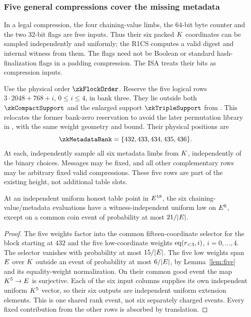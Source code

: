 \subsubsection{Five general compressions cover the missing metadata}

In a legal compression, the four chaining-value limbs, the $64$-bit byte counter and the two $32$-bit flags are free inputs. Thus their six packed $K$ coordinates can be sampled independently and uniformly; the R1CS computes a valid digest and internal witness from them. The flags need not be Boolean or standard hash-finalization flags in a padding compression. The ISA treats their bits as compression inputs.

Use the physical order $\zkFlockOrder$. Reserve the five logical rows $3\cdot2048+768+i$, $0\le i\le4$, in bank three. They lie outside both $\zkCompactSupport$ and the enlarged support $\zkTripleSupport$ from . This relocates the former bank-zero reservation to avoid the later permutation library in , with the same weight geometry and bound. Their physical positions are
\[
 \zkMetadataBank=\{432,433,434,435,436\}.
\]
At each, independently sample all six metadata limbs from $K$, independently of the binary choices. Messages may be fixed, and all other complementary rows may be arbitrary fixed valid compressions. These five rows are part of the existing height, not additional table slots.

\begin{lemma}\label{lem:zk-flock-metadata-bank}
At an independent uniform honest table point in $E^{18}$, the six chaining-value/metadata evaluations have a witness-independent uniform law on $E^6$, except on a common coin event of probability at most $21/|E|$.
\end{lemma}
\begin{proof}
The five weights factor into the common fifteen-coordinate selector for the block starting at $432$ and the five low-coordinate weights $\operatorname{eq}(r_{<3},i)$, $i=0,\ldots,4$. The selector vanishes with probability at most $15/|E|$. The five low weights span $E$ over $K$ outside an event of probability at most $6/|E|$, by Lemma~\ref{lem:five} and its equality-weight normalization. On their common good event the map $K^5\to E$ is surjective. Each of the six input columns supplies its own independent uniform $K^5$ vector, so their six outputs are independent uniform extension elements. This is one shared rank event, not six separately charged events. Every fixed contribution from the other rows is absorbed by translation.
\end{proof}

